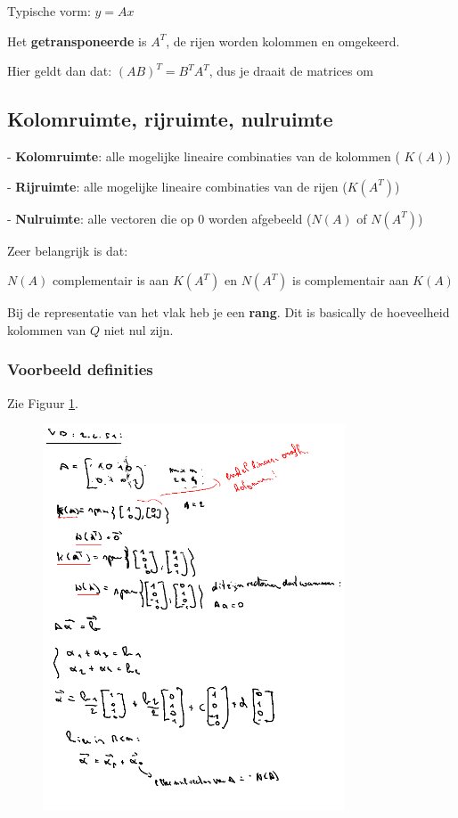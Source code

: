 \documentclass[a4paper]{article}
\begin{document}
Typische vorm: $y=Ax$

Het \textbf{getransponeerde} is $A^T$, de rijen worden kolommen en omgekeerd.

Hier geldt dan dat: $(AB)^T = B^T A^T$, dus je draait de matrices om

\subsection{Kolomruimte, rijruimte, nulruimte}

- \textbf{Kolomruimte}: alle mogelijke lineaire combinaties van de kolommen ( $K(A)$)

- \textbf{Rijruimte}: alle mogelijke lineaire combinaties van de rijen ($K(A^T)$)

- \textbf{Nulruimte}: alle vectoren die op 0 worden afgebeeld ($N(A)$ of $N(A^T)$)

Zeer belangrijk is dat:

$N(A)$ complementair is aan $K(A^T)$ en $N(A^T)$ is complementair aan $K(A)$

Bij de representatie van het vlak heb je een \textbf{rang}. Dit is basically de hoeveelheid kolommen van $Q$ niet nul zijn.

\subsubsection{Voorbeeld definities}

Zie Figuur \ref{fig:kolom_rij_null}.

\begin{figure}[hbpt!]
	\centering
	\includegraphics[width=0.8\textwidth]{assets/kolom_rij_null.png}
	\caption{}
	\label{fig:kolom_rij_null}
\end{figure}
\end{document}
